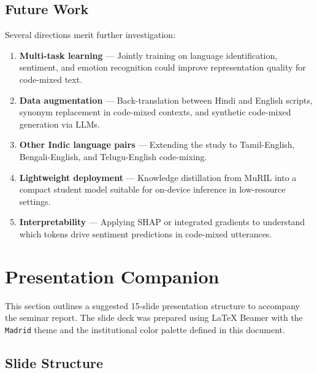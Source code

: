 \documentclass[12pt,a4paper]{report}
\begin{document}
\section{Future Work}

Several directions merit further investigation:

\begin{enumerate}[nosep,itemsep=3pt]
  \item \textbf{Multi-task learning} — Jointly training on language identification, sentiment, and emotion recognition could improve representation quality for code-mixed text.
  \item \textbf{Data augmentation} — Back-translation between Hindi and English scripts, synonym replacement in code-mixed contexts, and synthetic code-mixed generation via LLMs.
  \item \textbf{Other Indic language pairs} — Extending the study to Tamil-English, Bengali-English, and Telugu-English code-mixing.
  \item \textbf{Lightweight deployment} — Knowledge distillation from MuRIL into a compact student model suitable for on-device inference in low-resource settings.
  \item \textbf{Interpretability} — Applying SHAP or integrated gradients to understand which tokens drive sentiment predictions in code-mixed utterances.
\end{enumerate}

\chapter*{Presentation Companion}

This section outlines a suggested 15-slide presentation structure to accompany the seminar report. The slide deck was prepared using LaTeX Beamer with the \texttt{Madrid} theme and the institutional color palette defined in this document.

\section*{Slide Structure}
\end{document}
